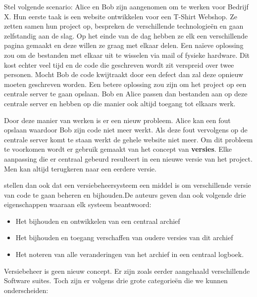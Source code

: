 Stel volgende scenario: Alice en Bob zijn aangenomen om te werken voor Bedrijf X. Hun eerste taak is een website ontwikkelen voor een T-Shirt Webshop. Ze zetten samen hun project op, bespreken de verschillende technologieën en gaan zelfstandig aan de slag. Op het einde van de dag hebben ze elk een verschillende pagina gemaakt en deze willen ze graag met elkaar delen. Een naïeve oplossing zou om de bestanden met elkaar uit te wisselen via mail of fysieke hardware. Dit kost echter veel tijd en de code die geschreven wordt zit verspreid over twee personen. Mocht Bob de code kwijtraakt door een defect dan zal deze opnieuw moeten geschreven worden. Een betere oplossing zou zijn om het project op een centrale server te gaan opslaan. Bob en Alice passen dan bestanden aan op deze centrale  server en hebben op die manier ook altijd toegang tot elkaars werk.

Door deze manier van werken is er een nieuw probleem. Alice kan een fout opslaan waardoor Bob zijn code niet meer werkt. Als deze fout vervolgens op de centrale server komt te staan werkt de gehele website niet meer. Om dit probleem te voorkomen wordt er gebruik gemaakt van het concept van \textbf{versies}. Elke aanpassing die er centraal gebeurd resulteert in een nieuwe versie van het project. Men kan altijd terugkeren naar een eerdere versie.

\textcite{Loeliger2009} stellen dan ook dat een versiebeheersysteem een middel is om verschillende versie van code te gaan beheren en bijhouden.De auteurs geven dan ook volgende drie eigenschappen waaraan elk systeem beantwoord:

\begin{itemize}
	\item Het bijhouden en ontwikkelen van een centraal archief
	\item Het bijhouden en toegang verschaffen van oudere versies van dit archief
	\item Het noteren van alle veranderingen van het archief in een centraal logboek.
\end{itemize}

Versiebeheer is geen nieuw concept. Er zijn zoals eerder aangehaald verschillende Software suites. Toch zijn er volgens \textcite{Chacon2014} drie grote categorieën die we kunnen onderscheiden:

